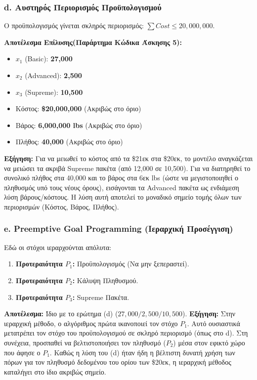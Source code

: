 \documentclass[12pt, a4paper]{article}
\begin{document}
\subsubsection*{d. Αυστηρός Περιορισμός Προϋπολογισμού}
Ο προϋπολογισμός γίνεται σκληρός περιορισμός: $\sum Cost \le 20,000,000$.

\textbf{Αποτέλεσμα Επίλυσης(Παράρτημα Κώδικα Άσκησης 5):}
\begin{itemize}
    \item $x_1$ (Basic): \textbf{27,000}
    \item $x_2$ (Advanced): \textbf{2,500}
    \item $x_3$ (Supreme): \textbf{10,500}
    \item Κόστος: \textbf{\$20,000,000} (Ακριβώς στο όριο)
    \item Βάρος: \textbf{6,000,000 lbs} (Ακριβώς στο όριο)
    \item Πλήθος: \textbf{40,000} (Ακριβώς στο όριο)
\end{itemize}

\textbf{Εξήγηση:} Για να μειωθεί το κόστος από τα \$21εκ στα \$20εκ, το μοντέλο αναγκάζεται να μειώσει τα ακριβά Supreme πακέτα (από 12,000 σε 10,500). Για να διατηρηθεί το συνολικό πλήθος στα 40,000 και το βάρος στα 6εκ lbs (ώστε να μεγιστοποιηθεί ο πληθυσμός υπό τους νέους όρους), εισάγονται τα Advanced πακέτα ως ενδιάμεση λύση βάρους/κόστους. Η λύση αυτή αποτελεί το μοναδικό σημείο τομής όλων των περιορισμών (Κόστος, Βάρος, Πλήθος).

\subsubsection*{e. Preemptive Goal Programming (Ιεραρχική Προσέγγιση)}
Εδώ οι στόχοι ιεραρχούνται απόλυτα:
\begin{enumerate}
    \item \textbf{Προτεραιότητα $P_1$:} Προϋπολογισμός (Να μην ξεπεραστεί).
    \item \textbf{Προτεραιότητα $P_2$:} Κάλυψη Πληθυσμού.
    \item \textbf{Προτεραιότητα $P_3$:} Supreme Πακέτα.
\end{enumerate}

\textbf{Αποτέλεσμα:} Ίδιο με το ερώτημα (d) ($27,000 / 2,500 / 10,500$).
\textbf{Εξήγηση:} Στην ιεραρχική μέθοδο, ο αλγόριθμος πρώτα ικανοποιεί τον στόχο $P_1$. Αυτό ουσιαστικά μετατρέπει τον στόχο του προϋπολογισμού σε σκληρό περιορισμό (όπως στο d). Στη συνέχεια, προσπαθεί να βελτιστοποιήσει τον πληθυσμό ($P_2$) μέσα στον εφικτό χώρο που άφησε ο $P_1$. Καθώς η λύση του (d) ήταν ήδη η βέλτιστη δυνατή χρήση των πόρων για τον πληθυσμό δεδομένου του ορίου των \$20εκ, η ιεραρχική μέθοδος καταλήγει στο ίδιο ακριβώς σημείο.
\end{document}
